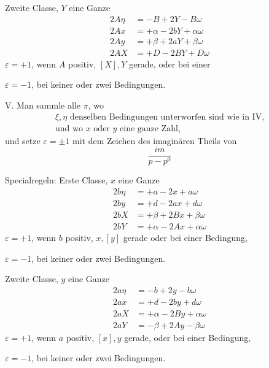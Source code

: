 %
Zweite Classe, $Y$ eine Ganze
\[
\begin{aligned}
2A\eta&=-B+2Y-B\omega\\
2Ax&=+\alpha-2bY+\alpha\omega\\
2Ay&=+\beta+2aY+\beta\omega\\
2AX&=+D-2BY+D\omega
\end{aligned}
\]
\noindent $\varepsilon=+1$, wenn $A$ positiv, $[X],Y$ gerade, oder bei einer\par
\noindent $\varepsilon=-1$, bei keiner oder zwei Bedingungen.

V. Man sammle alle $\pi$, wo
\[
\begin{gathered}
\xi,\eta\text{ denselben Bedingungen unterworfen sind wie in IV,}\\
\text{und wo }x\text{ oder }y\text{ eine ganze Zahl,}
\end{gathered}
\]
und setze $\varepsilon=\pm1$ mit dem Zeichen des imaginären Theils von
\[
\frac{im}{p-p^0}
\]

Specialregeln: Erste Classe, $x$ eine Ganze
\[
\begin{aligned}
2b\eta&=+a-2x+a\omega\\
2by&=+d-2ax+d\omega\\
2bX&=+\beta+2Bx+\beta\omega\\
2bY&=+\alpha-2Ax+\alpha\omega
\end{aligned}
\]
\noindent $\varepsilon=+1$, wenn $b$ positiv, $x,[y]$ gerade oder bei einer Bedingung,\par
\noindent $\varepsilon=-1$, bei keiner oder zwei Bedingungen.

Zweite Classe, $y$ eine Ganze
\[
\begin{aligned}
2a\eta&=-b+2y-b\omega\\
2ax&=+d-2by+d\omega\\
2aX&=+\alpha-2By+\alpha\omega\\
2aY&=-\beta+2Ay-\beta\omega
\end{aligned}
\]
\noindent $\varepsilon=+1$, wenn $a$ positiv, $[x],y$ gerade, oder bei einer Bedingung,\par
\noindent $\varepsilon=-1$, bei keiner oder zwei Bedingungen.

